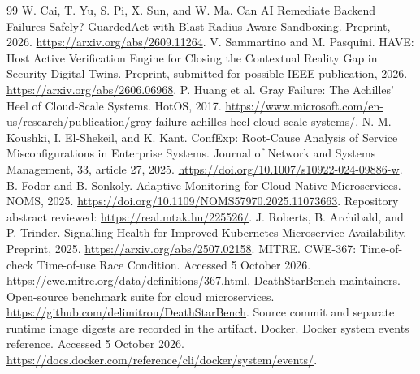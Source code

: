 \documentclass[manuscript,review,nonacm]{acmart}
\begin{document}
\begin{thebibliography}{99}
 W. Cai, T. Yu, S. Pi, X. Sun, and W. Ma. Can AI Remediate Backend Failures Safely? GuardedAct with Blast-Radius-Aware Sandboxing. Preprint, 2026. \url{https://arxiv.org/abs/2609.11264}.
 V. Sammartino and M. Pasquini. HAVE: Host Active Verification Engine for Closing the Contextual Reality Gap in Security Digital Twins. Preprint, submitted for possible IEEE publication, 2026. \url{https://arxiv.org/abs/2606.06968}.
 P. Huang et al. Gray Failure: The Achilles' Heel of Cloud-Scale Systems. HotOS, 2017. \url{https://www.microsoft.com/en-us/research/publication/gray-failure-achilles-heel-cloud-scale-systems/}.
 N. M. Koushki, I. El-Shekeil, and K. Kant. ConfExp: Root-Cause Analysis of Service Misconfigurations in Enterprise Systems. Journal of Network and Systems Management, 33, article 27, 2025. \url{https://doi.org/10.1007/s10922-024-09886-w}.
 B. Fodor and B. Sonkoly. Adaptive Monitoring for Cloud-Native Microservices. NOMS, 2025. \url{https://doi.org/10.1109/NOMS57970.2025.11073663}. Repository abstract reviewed: \url{https://real.mtak.hu/225526/}.
 J. Roberts, B. Archibald, and P. Trinder. Signalling Health for Improved Kubernetes Microservice Availability. Preprint, 2025. \url{https://arxiv.org/abs/2507.02158}.
 MITRE. CWE-367: Time-of-check Time-of-use Race Condition. Accessed 5 October 2026. \url{https://cwe.mitre.org/data/definitions/367.html}.
 DeathStarBench maintainers. Open-source benchmark suite for cloud microservices. \url{https://github.com/delimitrou/DeathStarBench}. Source commit and separate runtime image digests are recorded in the artifact.
 Docker. Docker system events reference. Accessed 5 October 2026. \url{https://docs.docker.com/reference/cli/docker/system/events/}.
\end{thebibliography}
\end{document}
